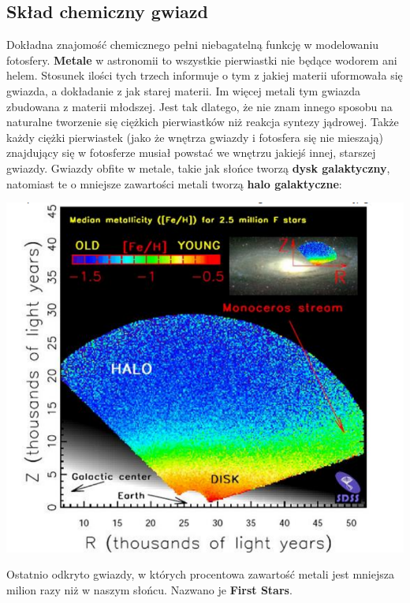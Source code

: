 \documentclass[../index.tex]{subfiles}
\begin{document}
        \subsection{Skład chemiczny gwiazd}
            Dokładna znajomość chemicznego pełni niebagatelną funkcję w modelowaniu fotosfery. \textbf{Metale} w astronomii to wszystkie pierwiastki nie będące wodorem ani helem. Stosunek ilości tych trzech informuje o tym z jakiej materii uformowała się gwiazda, a dokładanie z jak starej materii. Im więcej metali tym gwiazda zbudowana z materii młodszej. Jest tak dlatego, że nie znam innego sposobu na naturalne tworzenie się ciężkich pierwiastków niż reakcja syntezy jądrowej. Także każdy ciężki pierwiastek (jako że wnętrza gwiazdy i fotosfera się nie mieszają) znajdujący się w fotosferze musiał powstać we wnętrzu jakiejś innej, starszej gwiazdy. Gwiazdy obfite w metale, takie jak słońce tworzą \textbf{dysk galaktyczny}, natomiast te o mniejsze zawartości metali tworzą \textbf{halo galaktyczne}:
            \begin{center}
                \includegraphics[width=16cm]{images/drogaMlecznaMetale.png}
            \end{center}
            Ostatnio odkryto gwiazdy, w których procentowa zawartość metali jest mniejsza milion razy niż w naszym słońcu. Nazwano je \textbf{First Stars}.
\end{document}
